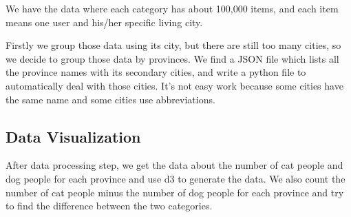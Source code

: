 \documentclass[12pt]{article}
\begin{document}
We have the data where each category has about 100,000 items, and each item means one user and his/her specific living city.

Firstly we group those data using its city, but there are still too many cities, so we decide to group those data by provinces. We find a JSON file which lists all the province names with its secondary cities, and write a python file to automatically deal with those cities. It's not easy work because some cities have the same name and some cities use abbreviations.

\subsection{Data Visualization}

After data processing step, we get the data about the number of cat people and dog people for each province and use d3 to generate the data. We also count the number of cat people minus the number of dog people for each province and try to find the difference between the two categories.
\end{document}
